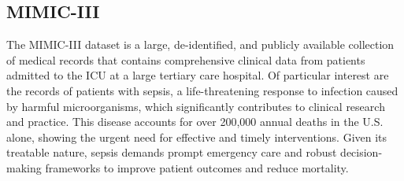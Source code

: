 










\subsection{\acrshort{MIMIC-III}}
The \acrshort{MIMIC-III} dataset \citep{johnson2016mimic} is a large, de-identified, and publicly available collection of medical records that contains comprehensive clinical data from patients admitted to the \acrfull{ICU} at a large tertiary care hospital. Of particular interest are the records of patients with sepsis, a life-threatening response to infection caused by harmful microorganisms, which significantly contributes to clinical research and practice. This disease accounts for over 200,000 annual deaths in the U.S. alone, showing the urgent need for effective and timely interventions. Given its treatable nature, sepsis demands prompt emergency care and robust decision-making frameworks to improve patient outcomes and reduce mortality.

